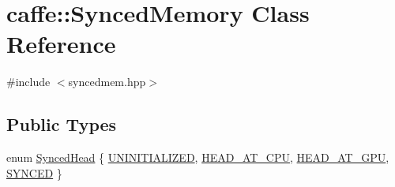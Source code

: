 \hypertarget{classcaffe_1_1_synced_memory}{\section{caffe\+:\+:Synced\+Memory Class Reference}
\label{classcaffe_1_1_synced_memory}
}


{\ttfamily \#include $<$syncedmem.\+hpp$>$}

\subsection*{Public Types}
\begin{DoxyCompactItemize}
\item 
enum \hyperlink{classcaffe_1_1_synced_memory_aa9d505f04322f6e521a57b8fc51dfba1}{Synced\+Head} \{ \hyperlink{classcaffe_1_1_synced_memory_aa9d505f04322f6e521a57b8fc51dfba1a9f1fa5001f0811db2894f95e60033fc9}{U\+N\+I\+N\+I\+T\+I\+A\+L\+I\+Z\+E\+D}, 
\hyperlink{classcaffe_1_1_synced_memory_aa9d505f04322f6e521a57b8fc51dfba1a00eb059ed546e67fa831fbab8a02ff7b}{H\+E\+A\+D\+\_\+\+A\+T\+\_\+\+C\+P\+U}, 
\hyperlink{classcaffe_1_1_synced_memory_aa9d505f04322f6e521a57b8fc51dfba1a9edbdf0774bdc1d03b20457ed68a106e}{H\+E\+A\+D\+\_\+\+A\+T\+\_\+\+G\+P\+U}, 
\hyperlink{classcaffe_1_1_synced_memory_aa9d505f04322f6e521a57b8fc51dfba1a5bb31ce97d6aef554f434f94c2a5d246}{S\+Y\+N\+C\+E\+D}
 \}
\end{DoxyCompactItemize}
